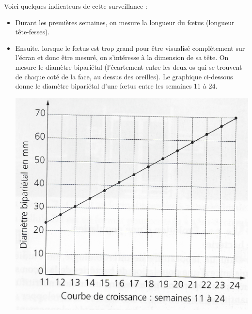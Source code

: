 \documentclass[a4paper,11pt]{exam}
\begin{document}
Voici quelques indicateurs de cette surveillance :
\begin{itemize}
	\item Durant les premières semaines, on mesure la longueur du f\oe tus (longueur tête-fesses).
	\item Ensuite, lorsque le f\oe tus est trop grand pour être visualisé complètement sur l'écran et donc être mesuré, on s'intéresse à la dimension de sa tête. On mesure le diamètre bipariétal (l'écartement entre les deux os qui se trouvent de chaque coté de la face, au dessus des oreilles). Le graphique ci-dessous donne le diamètre bipariétal d'une f\oe tus entre les semaines 11 à 24.
	
	\begin{center}
		\includegraphics[scale=0.2]{graph_foetus}
	\end{center}

\end{itemize}
\end{document}
